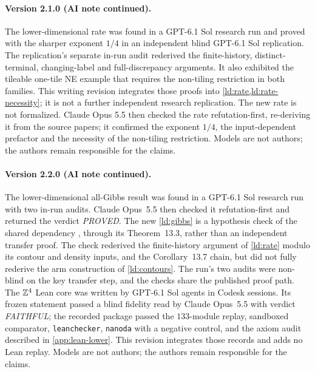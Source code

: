 \paragraph{Version 2.1.0 (AI note continued).}
The lower-dimensional rate was found in a GPT-6.1 Sol research run and proved with the sharper exponent $1/4$ in an independent blind GPT-6.1 Sol replication. The replication's separate in-run audit rederived the finite-history, distinct-terminal, changing-label and full-discrepancy arguments. It also exhibited the tileable one-tile NE example that requires the non-tiling restriction in both families. This writing revision integrates those proofs into \cref{ld:rate,ld:rate-necessity}; it is not a further independent research replication. The new rate is not formalized. Claude Opus 5.5 then checked the rate refutation-first, re-deriving it from the source papers; it confirmed the exponent $1/4$, the input-dependent prefactor and the necessity of the non-tiling restriction. Models are not authors; the authors remain responsible for the claims.

\paragraph{Version 2.2.0 (AI note continued).}
The lower-dimensional all-Gibbs result was found in a GPT-6.1 Sol research run with two in-run audits. Claude Opus~5.5 then checked it refutation-first and returned the verdict \emph{PROVED}. The new \cref{ld:gibbs} is a hypothesis check of the shared dependency \cite[Corollary~13.7]{DM26}, through its Theorem~13.3, rather than an independent transfer proof. The check rederived the finite-history argument of \cref{ld:rate} modulo its contour and density inputs, and the Corollary~13.7 chain, but did not fully rederive the arm construction of \cref{ld:contours}. The run's two audits were non-blind on the key transfer step, and the checks share the published proof path. The $\mathbb{Z}^4$ Lean core was written by GPT-6.1 Sol agents in Codesk sessions. Its frozen statement passed a blind fidelity read by Claude Opus~5.5 with verdict \emph{FAITHFUL}; the recorded package passed the $133$-module replay, sandboxed comparator, \texttt{leanchecker}, \texttt{nanoda} with a negative control, and the axiom audit described in \cref{app:lean-lower}. This revision integrates those records and adds no Lean replay. Models are not authors; the authors remain responsible for the claims.


